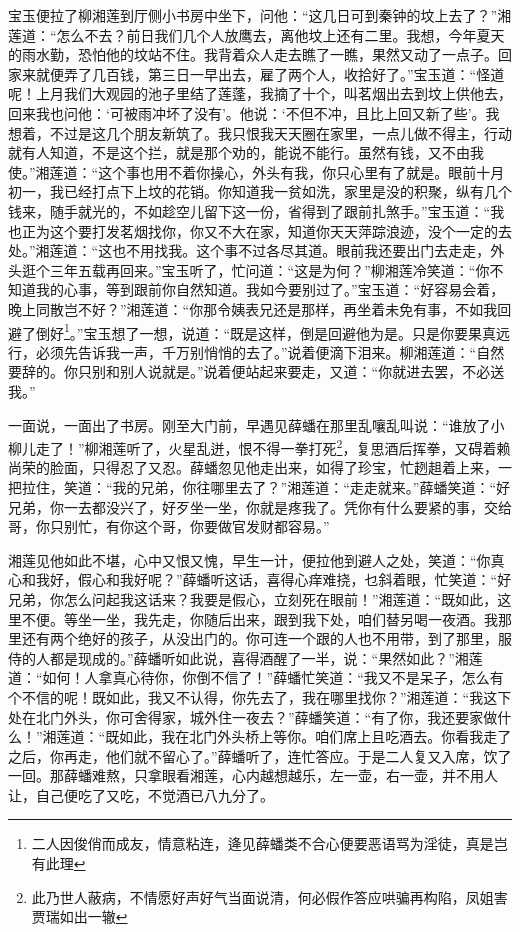 \documentclass[12pt,oneside]{book}
\begin{document}
宝玉便拉了柳湘莲到厅侧小书房中坐下，问他：“这几日可到秦钟的坟上去了？”湘莲道：“怎么不去？前日我们几个人放鹰去，离他坟上还有二里。我想，今年夏天的雨水勤，恐怕他的坟站不住。我背着众人走去瞧了一瞧，果然又动了一点子。回家来就便弄了几百钱，第三日一早出去，雇了两个人，收拾好了。”宝玉道：“怪道呢！上月我们大观园的池子里结了莲蓬，我摘了十个，叫茗烟出去到坟上供他去，回来我也问他：‘可被雨冲坏了没有’。他说：‘不但不冲，且比上回又新了些’。我想着，不过是这几个朋友新筑了。我只恨我天天圈在家里，一点儿做不得主，行动就有人知道，不是这个拦，就是那个劝的，能说不能行。虽然有钱，又不由我使。”湘莲道：“这个事也用不着你操心，外头有我，你只心里有了就是。眼前十月初一，我已经打点下上坟的花销。你知道我一贫如洗，家里是没的积聚，纵有几个钱来，随手就光的，不如趁空儿留下这一份，省得到了跟前扎煞手。”宝玉道：“我也正为这个要打发茗烟找你，你又不大在家，知道你天天萍踪浪迹，没个一定的去处。”湘莲道：“这也不用找我。这个事不过各尽其道。眼前我还要出门去走走，外头逛个三年五载再回来。”宝玉听了，忙问道：“这是为何？”柳湘莲冷笑道：“你不知道我的心事，等到跟前你自然知道。我如今要别过了。”宝玉道：“好容易会着，晚上同散岂不好？”湘莲道：“你那令姨表兄还是那样，再坐着未免有事，不如我回避了倒好\footnote{二人因俊俏而成友，情意粘连，逄见薛蟠类不合心便要恶语骂为淫徒，真是岂有此理}。”宝玉想了一想，说道：“既是这样，倒是回避他为是。只是你要果真远行，必须先告诉我一声，千万别悄悄的去了。”说着便滴下泪来。柳湘莲道：“自然要辞的。你只别和别人说就是。”说着便站起来要走，又道：“你就进去罢，不必送我。”

一面说，一面出了书房。刚至大门前，早遇见薛蟠在那里乱嚷乱叫说：“谁放了小柳儿走了！”柳湘莲听了，火星乱迸，恨不得一拳打死\footnote{此乃世人蔽病，不情愿好声好气当面说清，何必假作答应哄骗再构陷，凤姐害贾瑞如出一辙}，复思酒后挥拳，又碍着赖尚荣的脸面，只得忍了又忍。薛蟠忽见他走出来，如得了珍宝，忙趔趄着上来，一把拉住，笑道：“我的兄弟，你往哪里去了？”湘莲道：“走走就来。”薛蟠笑道：“好兄弟，你一去都没兴了，好歹坐一坐，你就是疼我了。凭你有什么要紧的事，交给哥，你只别忙，有你这个哥，你要做官发财都容易。”

湘莲见他如此不堪，心中又恨又愧，早生一计，便拉他到避人之处，笑道：“你真心和我好，假心和我好呢？”薛蟠听这话，喜得心痒难挠，乜斜着眼，忙笑道：“好兄弟，你怎么问起我这话来？我要是假心，立刻死在眼前！”湘莲道：“既如此，这里不便。等坐一坐，我先走，你随后出来，跟到我下处，咱们替另喝一夜酒。我那里还有两个绝好的孩子，从没出门的。你可连一个跟的人也不用带，到了那里，服侍的人都是现成的。”薛蟠听如此说，喜得酒醒了一半，说：“果然如此？”湘莲道：“如何！人拿真心待你，你倒不信了！”薛蟠忙笑道：“我又不是呆子，怎么有个不信的呢！既如此，我又不认得，你先去了，我在哪里找你？”湘莲道：“我这下处在北门外头，你可舍得家，城外住一夜去？”薛蟠笑道：“有了你，我还要家做什么！”湘莲道：“既如此，我在北门外头桥上等你。咱们席上且吃酒去。你看我走了之后，你再走，他们就不留心了。”薛蟠听了，连忙答应。于是二人复又入席，饮了一回。那薛蟠难熬，只拿眼看湘莲，心内越想越乐，左一壶，右一壶，并不用人让，自己便吃了又吃，不觉酒已八九分了。
\end{document}
